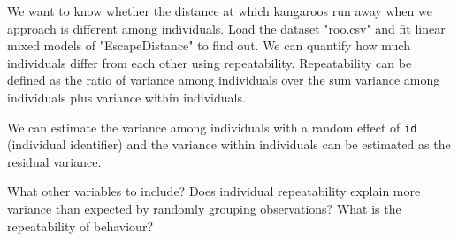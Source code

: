 \documentclass[12pt,a4paper]{scrartcl}\usepackage[]{graphicx}\usepackage[]{color}
\begin{document}
\begin{Exercise}[difficulty=3, title={Do kangaroos have personalities?}]

We want to know whether the distance at which kangaroos run away when we approach is different among individuals. Load the dataset "roo.csv" and fit linear mixed models of "EscapeDistance" to find out. We can quantify how much individuals differ from each other using repeatability. Repeatability can be defined as the ratio of variance among individuals over the sum variance among individuals plus variance within individuals. 

We can estimate the variance among individuals with a random effect of \texttt{id} (individual identifier) and the variance within individuals can be estimated as the residual variance. 

What other variables to include? Does individual repeatability explain more variance than expected by randomly grouping observations? What is the repeatability of behaviour?
\end{Exercise}
\end{document}
